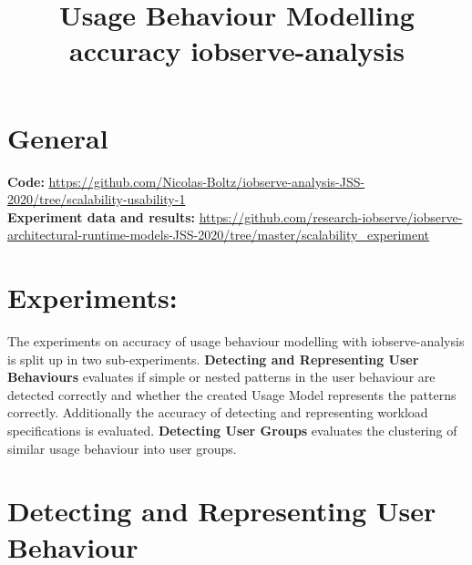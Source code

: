 \documentclass[10pt,a4paper]{article}
\begin{document}
\title{Usage Behaviour Modelling\\accuracy iobserve-analysis}
\date{}
\maketitle

	\section{General}
	\textbf{Code:} \url{https://github.com/Nicolas-Boltz/iobserve-analysis-JSS-2020/tree/scalability-usability-1}\\
	\textbf{Experiment data and results:} \url{https://github.com/research-iobserve/iobserve-architectural-runtime-models-JSS-2020/tree/master/scalability_experiment}
	
	\section{Experiments:}
	The experiments on accuracy of usage behaviour modelling with iobserve-analysis is split up in two sub-experiments. \textbf{Detecting and Representing User Behaviours} evaluates if simple or nested patterns in the user behaviour are detected correctly and whether the created Usage Model represents the patterns correctly. Additionally the accuracy of detecting and representing workload specifications is evaluated. \textbf{Detecting User Groups} evaluates the clustering of similar usage behaviour into user groups.

	\section{Detecting and Representing User Behaviour}
\end{document}
